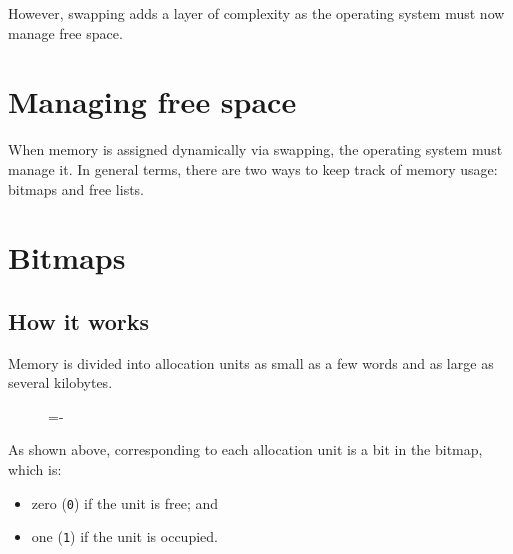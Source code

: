 \documentclass[a4paper]{systems-software}
\begin{document}
However, swapping adds a layer of complexity as the operating system must now manage free space.


\newpage

\section{Managing free space}

When memory is assigned dynamically via swapping, the operating system must manage it. In general terms, there are two ways to keep track of memory usage: bitmaps and free lists.


\section*{Bitmaps}

\subsection*{How it works}

Memory is divided into allocation units as small as a few words and as large as several kilobytes.

\begin{figure}[H]
  \lineskip=-\fboxrule
\end{figure}

As shown above, corresponding to each allocation unit is a bit in the bitmap, which is:
\begin{itemize}
	\item zero (\texttt{0}) if the unit is free; and
	\item one (\texttt{1}) if the unit is occupied.
\end{itemize}
\end{document}
